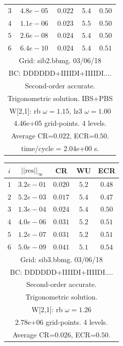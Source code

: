 \begin{table}[hbt]
\begin{center}
{\begin{tabular}{|c|c|c|c|c|}
 $ 3$  & $ 4.8e-05$ & $0.022$ & $ 5.4$ & $0.50$ \\ 
 $ 4$  & $ 1.1e-06$ & $0.023$ & $ 5.5$ & $0.50$ \\ 
 $ 5$  & $ 2.6e-08$ & $0.024$ & $ 5.4$ & $0.50$ \\ 
 $ 6$  & $ 6.4e-10$ & $0.024$ & $ 5.4$ & $0.51$ \\ 
\hline 
\multicolumn{5}{|c|}{Grid: sib2.bbmg. 03/06/18}  \\
\multicolumn{5}{|c|}{BC: DDDDDD+IIIIDI+IIIIDI....}  \\
\multicolumn{5}{|c|}{Second-order accurate.}  \\
\multicolumn{5}{|c|}{Trigonometric solution. IBS+PBS}  \\
\multicolumn{5}{|c|}{W[2,1]: rb $\omega=1.15$, lz3 $\omega=1.00$}  \\
\multicolumn{5}{|c|}{4.46e+05 grid-points. 4 levels.}  \\
\multicolumn{5}{|c|}{Average CR=$0.022$, ECR=$0.50$.}  \\
\multicolumn{5}{|c|}{time/cycle = 2.04e+00 s.}  \\
\hline 
\end{tabular}
\begin{tabular}{|c|c|c|c|c|} \hline 
 $i$   & $\vert\vert\mbox{res}\vert\vert_\infty$  &  CR     &  WU    & ECR  \\   \hline 
 $ 1$  & $ 3.2e-01$ & $0.020$ & $ 5.2$ & $0.48$ \\ 
 $ 2$  & $ 5.2e-03$ & $0.017$ & $ 5.4$ & $0.47$ \\ 
 $ 3$  & $ 1.3e-04$ & $0.024$ & $ 5.4$ & $0.50$ \\ 
 $ 4$  & $ 4.0e-06$ & $0.031$ & $ 5.2$ & $0.51$ \\ 
 $ 5$  & $ 1.2e-07$ & $0.031$ & $ 5.2$ & $0.51$ \\ 
 $ 6$  & $ 5.0e-09$ & $0.041$ & $ 5.1$ & $0.54$ \\ 
\hline 
\multicolumn{5}{|c|}{Grid: sib3.bbmg. 03/06/18}  \\
\multicolumn{5}{|c|}{BC: DDDDDD+IIIIDI+IIIIDI....}  \\
\multicolumn{5}{|c|}{Second-order accurate.}  \\
\multicolumn{5}{|c|}{Trigonometric solution.}  \\
\multicolumn{5}{|c|}{W[2,1]: rb $\omega=1.26$}  \\
\multicolumn{5}{|c|}{2.78e+06 grid-points. 4 levels.}  \\
\multicolumn{5}{|c|}{Average CR=$0.026$, ECR=$0.50$.}  \\

\end{tabular}}
\end{center}
\end{table}

